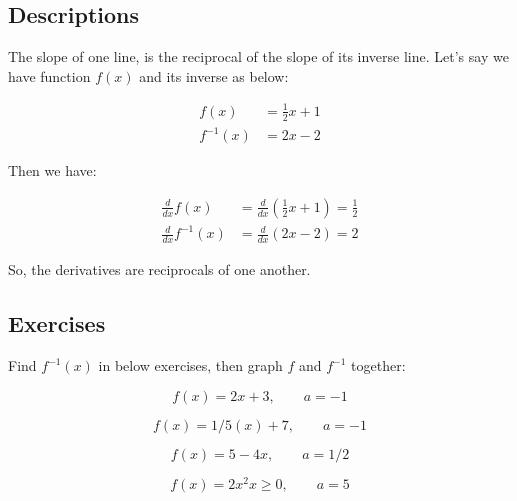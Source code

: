 \documentclass[fleqn]{article}
\begin{document}
\thispagestyle{empty}

\subsection*{Descriptions}
\noindent
The slope of one line, is the reciprocal of the slope of its inverse line.
\newline
Let's say we have function $f(x)$ and its inverse as below:

\begin{align*}
f(x) &= \frac{1}{2}x + 1 \\
f^{-1}(x) &= 2x - 2
\end{align*}
\newline

\noindent
Then we have:

\begin{align*}
\frac{d}{dx}f(x) &= \frac{d}{dx}\left(\frac{1}{2}x + 1\right) = \frac{1}{2} \\
\frac{d}{dx}f^{-1}(x) &= \frac{d}{dx}(2x - 2) = 2
\end{align*}
\newline

\noindent
So, the derivatives are reciprocals of one another.
\newline

\subsection*{Exercises}
\noindent
Find $f^{-1}(x)$ in below exercises, then graph $f$ and $f^{-1}$ together:
\newline

\begin{equation*}
    f(x) = 2x + 3, \qquad a = -1
\end{equation*}

\begin{equation*}
    f(x) = 1/5(x) + 7, \qquad a = -1
\end{equation*}

\begin{equation*}
    f(x) = 5 - 4x, \qquad a = 1/2
\end{equation*}

\begin{equation*}
    f(x) = 2x^2 x \geq 0, \qquad a = 5
\end{equation*}
\end{document}
